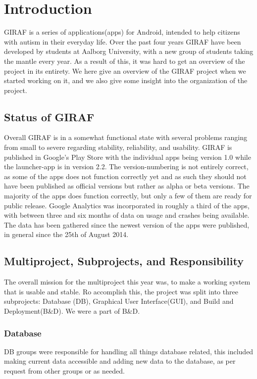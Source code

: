 \chapter{Introduction} \label{ChapIntroduction}
GIRAF is a series of applications(apps) for Android, intended to help citizens with autism in their everyday life. Over the past four years GIRAF have been developed by students at Aalborg University, with a new group of students taking the mantle every year. As a result of this, it was hard to get an overview of the project in its entirety. We here give an overview of the GIRAF project when we started working on it, and we also give some insight into the organization of the project.

\section{Status of GIRAF}
Overall GIRAF is in a somewhat functional state with several problems ranging from small to severe regarding stability, reliability, and usability.
GIRAF is published in Google's Play Store with the individual apps being version 1.0 while the launcher-app is in version 2.2. The version-numbering is not entirely correct, as some of the apps does not function correctly yet and as such they should not have been published as official versions but rather as alpha or beta versions. The majority of the apps does function correctly, but only a few of them are ready for public release.
Google Analytics was incorporated in roughly a third of the apps, with between three and six months of data on usage and crashes being available. The data has been gathered since the newest version of the apps were published, in general since the 25th of August 2014.

\section{Multiproject, Subprojects, and Responsibility}
The overall mission for the multiproject this year was, to make a working system that is usable and stable. Ro accomplish this, the project was split into three subprojects: Database (DB), Graphical User Interface(GUI), and Build and Deployment(B\&D). We were a part of B\&D.

\subsection{Database}
DB groups were responsible for handling all things database related, this included making current data accessible and adding new data to the database, as per request from other groups or as needed.

